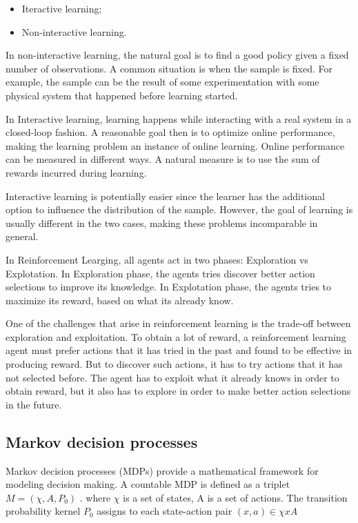 \begin{itemize}
\item Iteractive learning;
\item Non-interactive learning.
\end{itemize}

In non-interactive learning, the natural goal is to find a good policy given a fixed number of observations. A common situation is when the sample is fixed. For example, the sample can be the result of some experimentation with some physical system that happened before learning started. 

In Interactive learning, learning happens while interacting with a real system in a closed-loop fashion. A reasonable goal then is to optimize online performance,
making the learning problem an instance of online learning. Online performance can be measured in different ways. A natural measure is to use the sum of rewards incurred during learning. 

Interactive learning is potentially easier since the learner has the additional option to influence the distribution of the sample. However, the goal of
learning is usually different in the two cases, making these problems incomparable in general.

In Reinforcement Learging, all agents act in two phases: Exploration vs Explotation. In Exploration phase, the agents tries discover better action selections to improve its knowledge. In Explotation phase, the agents tries to maximize its reward, based on what its already know.

One of the challenges that arise in reinforcement learning is the trade-off between exploration and exploitation. To obtain a lot of reward, a reinforcement learning
agent must prefer actions that it has tried in the past and found to be effective in producing reward.
But to discover such actions, it has to try actions that it has not selected before. The agent has to exploit what it already knows in order to obtain reward, but it also has to explore in order to make better action selections in the future.





\subsection{Markov decision processes}

Markov decision processes (MDPs) provide a mathematical framework for modeling decision making. A countable MDP is defined as a triplet $M=(\chi,A,P_{0})$ \cite{Szepesvari2010}. where $\chi$ is a set of states, A is a set of actions. The transition probability kernel $P_{0}$ assigns to each state-action pair $(x, a) \in \chi x A $


